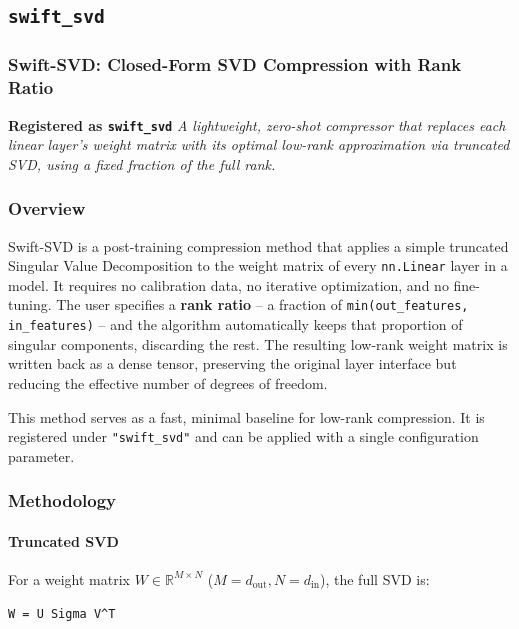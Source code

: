 \subsection{\texttt{swift\_svd}}
\subsubsection*{Swift-SVD: Closed-Form SVD Compression with Rank Ratio}

\textbf{Registered as \texttt{swift\_svd}}
\textit{A lightweight, zero-shot compressor that replaces each linear layer's weight matrix with its optimal low-rank approximation via truncated SVD, using a fixed fraction of the full rank.}


\subsubsection*{Overview}

Swift-SVD is a post-training compression method that applies a simple truncated Singular Value Decomposition to the weight matrix of every \texttt{nn.Linear} layer in a model. It requires no calibration data, no iterative optimization, and no fine-tuning. The user specifies a \textbf{rank ratio} -- a fraction of \texttt{min(out\_features, in\_features)} -- and the algorithm automatically keeps that proportion of singular components, discarding the rest. The resulting low-rank weight matrix is written back as a dense tensor, preserving the original layer interface but reducing the effective number of degrees of freedom.

This method serves as a fast, minimal baseline for low-rank compression. It is registered under \texttt{"swift\_svd"} and can be applied with a single configuration parameter.


\subsubsection*{Methodology}

\paragraph{Truncated SVD}

For a weight matrix $W \in \mathbb{R}^{M \times N}$ ($M = d_{\text{out}}, N = d_{\text{in}}$), the full SVD is:

\vspace{0.5em}
\begin{mdframed}[backgroundcolor=codebg, linecolor=codeframe, linewidth=1pt, roundcorner=4pt, innerleftmargin=2pt, innerrightmargin=5pt, innertopmargin=5pt, innerbottommargin=5pt]
\begin{lstlisting}
W = U Sigma V^T
\end{lstlisting}
\end{mdframed}
\vspace{0.5em}


